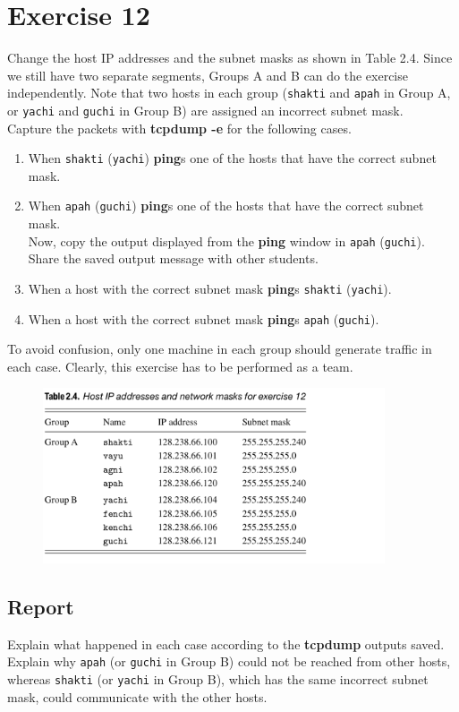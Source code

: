 \documentclass[10pt,a4paper]{article}
\numberwithin{equation}{section}
\numberwithin{figure}{section}
\numberwithin{table}{section}
\begin{document}
    \section{Exercise 12}
    Change the host IP addresses and the subnet masks as shown in Table 2.4. Since we still have two separate segments, Groups A and B can do the exercise independently.
    Note that two hosts in each group (\texttt{shakti} and \texttt{apah} in Group A, or \texttt{yachi} and \texttt{guchi} in Group B) are assigned an incorrect subnet mask. \\
    Capture the packets with \textbf{tcpdump -e} for the following cases. \\
    \begin{enumerate}
        \item When \texttt{shakti} (\texttt{yachi}) \textbf{ping}s one of the hosts that have the correct subnet mask.
        \item When \texttt{apah} (\texttt{guchi}) \textbf{ping}s one of the hosts that have the correct subnet mask. \\ Now, copy the output displayed from the \textbf{ping} window in \texttt{apah} (\texttt{guchi}).
        Share the saved output message with other students.
        \item When a host with the correct subnet mask \textbf{ping}s \texttt{shakti} (\texttt{yachi}).
        \item When a host with the correct subnet mask \textbf{ping}s \texttt{apah} (\texttt{guchi}).
    \end{enumerate}
    To avoid confusion, only one machine in each group should generate traffic in each case.
    Clearly, this exercise has to be performed as a team.
    \begin{figure}[H]
        \centering
        \includegraphics[width=0.9\textwidth]{img/table2-4.png}
    \end{figure}
    \subsection*{Report}
    Explain what happened in each case according to the \textbf{tcpdump} outputs saved.
    Explain why \texttt{apah} (or \texttt{guchi} in Group B) could not be reached from other hosts, whereas \texttt{shakti} (or \texttt{yachi} in Group B), which has the same incorrect subnet mask, could communicate with the other hosts.
\end{document}
